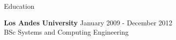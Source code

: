 \documentclass{resume} %
\def\uniandes{Los Andes University }
\begin{document}


\begin{rSection}{Education}

{\bf \uniandes} \hfill January 2009 - December 2012 \\ 
BSc Systems and Computing Engineering \\

\end{rSection}

\end{document}
